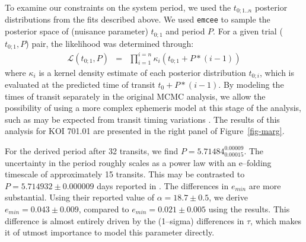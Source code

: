 To examine our constraints on the system period, we used the
$t_{0;1..n}$ posterior distributions from the fits described above.
We used {\tt emcee} to sample the posterior space of (nuisance
parameter) $t_{0;1}$ and period $P$.  For a given trial ($t_{0;1}, P$)
pair, the likelihood was determined through:
\begin{eqnarray}
\mathcal{L}(t_{0;1}, P) & = & \prod_{i=1}^{i=n} \kappa_i(t_{0;1} + P * (i-1))
\end{eqnarray}
where $\kappa_i$ is a kernel density estimate of each posterior
distribution $t_{0;i}$, which is evaluated at the predicted time of
transit $t_0 + P * (i-1)$.  By modeling the times of transit
separately in the original MCMC analysis, we allow the possibility of
using a more complex ephemeris model at this stage of the analysis,
such as may be expected from transit timing variations
\citep{2005MNRAS.359..567A,2005Sci...307.1288H}.  The results of this
analysis for KOI 701.01 are presented in the right panel of
Figure~\ref{fig-marg}.

For the derived period after 32 transits, we find $P =
5.71484_{0.00015}^{0.00009}$.  The uncertainty in the period roughly
scales as a power law with an e--folding timescale of approximately 15
transits.  This may be contrasted to $P = 5.714932 \pm 0.000009$ days
reported in \cite{2013arXiv1304.7387B}.  The differences in $e_{min}$
are more substantial.  Using their reported value of $\alpha =
18.7 \pm 0.5$, we derive $e_{min} = 0.043 \pm 0.009$, compared to
$e_{min} = 0.021 \pm 0.005$ using the \cite{2013arXiv1304.7387B}
results.  This difference is almost entirely driven by the (1--sigma)
differences in $\tau$, which makes it of utmost importance to model
this parameter directly.


